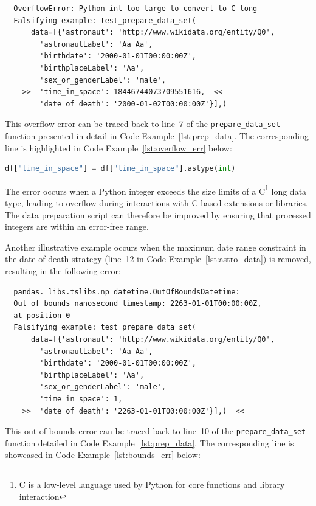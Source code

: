 \documentclass[runningheads]{llncs}
\begin{document}
\begin{verbatim}
  OverflowError: Python int too large to convert to C long
  Falsifying example: test_prepare_data_set(
      data=[{'astronaut': 'http://www.wikidata.org/entity/Q0',
        'astronautLabel': 'Aa Aa',
        'birthdate': '2000-01-01T00:00:00Z',
        'birthplaceLabel': 'Aa',
        'sex_or_genderLabel': 'male',
    >>  'time_in_space': 18446744073709551616,  <<
        'date_of_death': '2000-01-02T00:00:00Z'}],)
\end{verbatim}
This overflow error can be traced back to line~7 of the \texttt{prepare\_data\_set} function presented in detail in Code Example~\ref{lst:prep_data}. The corresponding line is highlighted in Code Example~\ref{lst:overflow_err} below:

\begin{lstlisting}[language=Python,caption={Trace Overflow Error from \texttt{data\_analysis.ipynb}},label=lst:overflow_err,firstnumber=7]
df["time_in_space"] = df["time_in_space"].astype(int)
\end{lstlisting}
The error occurs when a Python integer exceeds the size limits of a C\footnote{C is a low-level language used by Python for core functions and library interaction} long data type, leading to overflow during interactions with C-based extensions or libraries. The data preparation script can therefore be improved by ensuring that processed integers are within an error-free range.

\newpage
\noindent Another illustrative example occurs when the maximum date range constraint in the date of death strategy (line~12 in Code Example~\ref{lst:astro_data}) is removed, resulting in the following error:

\begin{verbatim}
  pandas._libs.tslibs.np_datetime.OutOfBoundsDatetime: 
  Out of bounds nanosecond timestamp: 2263-01-01T00:00:00Z, 
  at position 0
  Falsifying example: test_prepare_data_set(
      data=[{'astronaut': 'http://www.wikidata.org/entity/Q0',
        'astronautLabel': 'Aa Aa',
        'birthdate': '2000-01-01T00:00:00Z',
        'birthplaceLabel': 'Aa',
        'sex_or_genderLabel': 'male',
        'time_in_space': 1,
    >>  'date_of_death': '2263-01-01T00:00:00Z'}],)  <<
\end{verbatim}
This out of bounds error can be traced back to line~10 of the \texttt{prepare\_data\_set} function detailed in Code Example~\ref{lst:prep_data}. The corresponding line is showcased in Code Example~\ref{lst:bounds_err} below:
\end{document}
